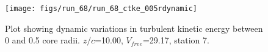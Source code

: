 \begin{figure}[H]
\centering
\texttt{[image: figs/run\_68/run\_68\_ctke\_005rdynamic]}
\caption{Plot showing dynamic variations in turbulent kinetic energy between 0 and 0.5 core radii. $z/c$=10.00, $V_{free}$=29.17, station 7.}
\end{figure}


